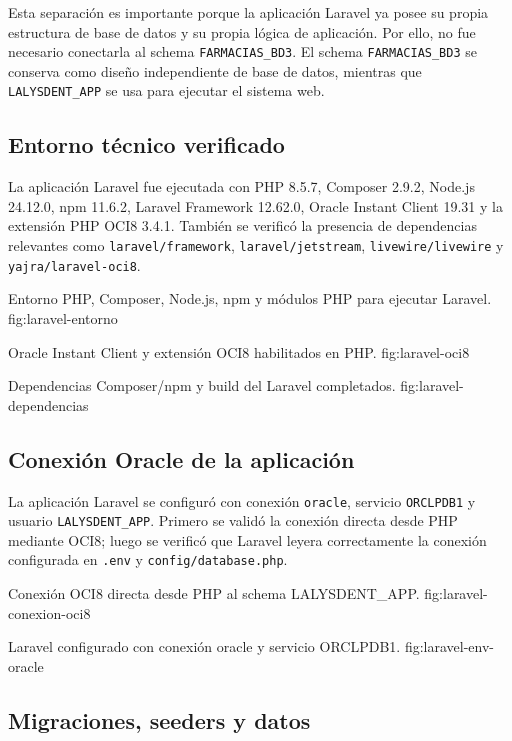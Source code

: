 Esta separación es importante porque la aplicación Laravel ya posee su propia estructura de base de datos y su propia lógica de aplicación. Por ello, no fue necesario conectarla al schema \texttt{FARMACIAS\_BD3}. El schema \texttt{FARMACIAS\_BD3} se conserva como diseño independiente de base de datos, mientras que \texttt{LALYSDENT\_APP} se usa para ejecutar el sistema web.

\subsection{Entorno técnico verificado}

La aplicación Laravel fue ejecutada con PHP 8.5.7, Composer 2.9.2, Node.js 24.12.0, npm 11.6.2, Laravel Framework 12.62.0, Oracle Instant Client 19.31 y la extensión PHP OCI8 3.4.1. También se verificó la presencia de dependencias relevantes como \texttt{laravel/framework}, \texttt{laravel/jetstream}, \texttt{livewire/livewire} y \texttt{yajra/laravel-oci8}.

{Entorno PHP, Composer, Node.js, npm y módulos PHP para ejecutar Laravel.}
{fig:laravel-entorno}

{Oracle Instant Client y extensión OCI8 habilitados en PHP.}
{fig:laravel-oci8}

{Dependencias Composer/npm y build del Laravel completados.}
{fig:laravel-dependencias}

\subsection{Conexión Oracle de la aplicación}

La aplicación Laravel se configuró con conexión \texttt{oracle}, servicio \texttt{ORCLPDB1} y usuario \texttt{LALYSDENT\_APP}. Primero se validó la conexión directa desde PHP mediante OCI8; luego se verificó que Laravel leyera correctamente la conexión configurada en \texttt{.env} y \texttt{config/database.php}.

{Conexión OCI8 directa desde PHP al schema LALYSDENT\_APP.}
{fig:laravel-conexion-oci8}

{Laravel configurado con conexión oracle y servicio ORCLPDB1.}
{fig:laravel-env-oracle}

\subsection{Migraciones, seeders y datos}

